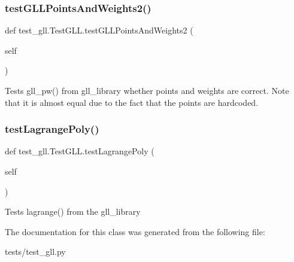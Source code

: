 \subsubsection{\texorpdfstring{test\+G\+L\+L\+Points\+And\+Weights2()}{testGLLPointsAndWeights2()}}
{\footnotesize\ttfamily def test\+\_\+gll.\+Test\+G\+L\+L.\+test\+G\+L\+L\+Points\+And\+Weights2 (\begin{DoxyParamCaption}\item[{}]{self }\end{DoxyParamCaption})}

\begin{DoxyVerb}Tests gll_pw() from gll_library whether points and weights 
are correct. Note that it is almost equal due to the fact that
the points are hardcoded.
\end{DoxyVerb}
 \mbox{\label{classtest__gll_1_1_test_g_l_l_a95fd324973c22c9edae81c4adbed0c4f}} 
\subsubsection{\texorpdfstring{test\+Lagrange\+Poly()}{testLagrangePoly()}}
{\footnotesize\ttfamily def test\+\_\+gll.\+Test\+G\+L\+L.\+test\+Lagrange\+Poly (\begin{DoxyParamCaption}\item[{}]{self }\end{DoxyParamCaption})}

\begin{DoxyVerb}Tests lagrange() from the gll_library\end{DoxyVerb}
 

The documentation for this class was generated from the following file\+:\begin{DoxyCompactItemize}
\item 
tests/test\+\_\+gll.\+py\end{DoxyCompactItemize}
